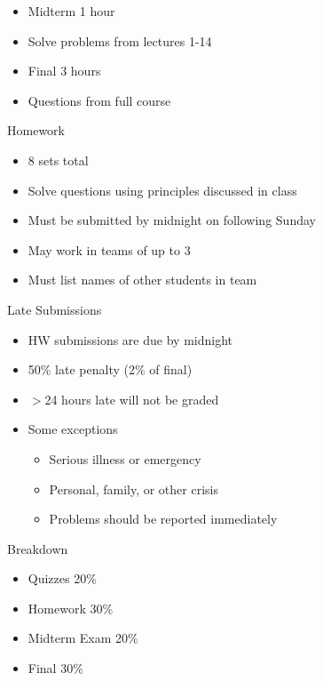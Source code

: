 \documentclass{report}
\begin{document}
\begin{description}
\begin{mdframed}
\begin{itemize}
                \item Midterm 1 hour
                \item Solve problems from lectures 1-14
            \end{itemize}
            \begin{itemize}
                \item Final 3 hours
                \item Questions from full course
            \end{itemize}
            {\large Homework}
            \begin{itemize}
                \item 8 sets total
                \item Solve questions using principles discussed
                    in class
                \item Must be submitted by midnight on following
                    Sunday
                \item May work in teams of up to 3
                \item Must list names of other students in team
            \end{itemize}
            {\large Late Submissions}
            \begin{itemize}
                \item HW submissions are due by midnight
                \item 50\% late penalty (2\% of final)
                \item $>$24 hours late will not be graded
                \item Some exceptions
                    \begin{itemize}
                        \item Serious illness or emergency
                        \item Personal, family, or other crisis
                        \item Problems should be reported
                            immediately
                    \end{itemize}
            \end{itemize}
            {\large Breakdown}
            \begin{itemize}
                \item Quizzes 20\%
                \item Homework 30\%
                \item Midterm Exam 20\%
                \item Final 30\%

\end{itemize}
\end{mdframed}
\end{description}
\end{document}
